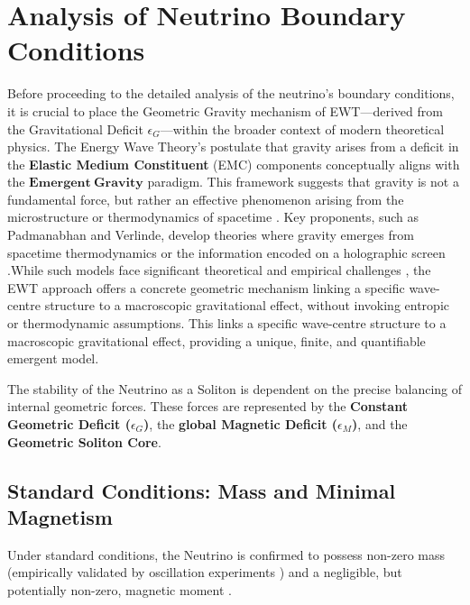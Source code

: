 \documentclass[10pt,a4paper]{article}
\begin{document}
\section{Analysis of Neutrino Boundary Conditions}
\label{sec:neutrino-analysis}

Before proceeding to the detailed analysis of the neutrino's boundary conditions, it is crucial to place the Geometric Gravity mechanism of EWT---derived from the Gravitational Deficit \(\epsilon_{G}\)---within the broader context of modern theoretical physics. The Energy Wave Theory's postulate that gravity arises from a deficit in the \textbf{Elastic Medium Constituent} (EMC) components conceptually aligns with the \(\mathbf{Emergent~Gravity}\) paradigm. This framework suggests that gravity is not a fundamental force, but rather an effective phenomenon arising from the microstructure or thermodynamics of spacetime \cite{padmanabhan2010thermodynamics}. Key proponents, such as Padmanabhan and Verlinde, develop theories where gravity emerges from spacetime thermodynamics or the information encoded on a holographic screen \cite{verlinde2016emergent}.While such models face significant theoretical and empirical challenges \cite{visser2020emergent}, the EWT approach offers a concrete geometric mechanism linking a specific wave-centre structure to a macroscopic gravitational effect, without invoking entropic or thermodynamic assumptions. This links a specific wave-centre structure to a macroscopic gravitational effect, providing a unique, finite, and quantifiable emergent model.

The stability of the Neutrino as a Soliton is dependent on the precise balancing of internal geometric forces. These forces are represented by the \textbf{Constant Geometric Deficit (\(\epsilon_{G}\))}, the \textbf{global Magnetic Deficit (\(\epsilon_{M}\))}, and the \textbf{Geometric Soliton Core}.

\subsection{Standard Conditions: Mass and Minimal Magnetism}

Under standard conditions, the Neutrino is confirmed to possess non-zero mass (empirically validated by oscillation experiments \cite{kajita1998evidence, mcdonald2002sno}) and a negligible, but potentially non-zero, magnetic moment \cite{tereschenko2012results}.
\end{document}
